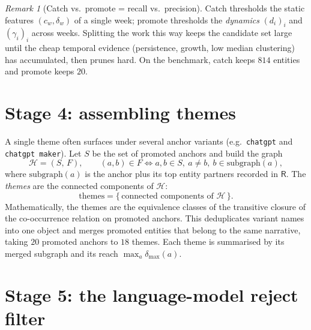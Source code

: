 \documentclass[11pt]{article}
\renewcommand{\deg}{\delta}                               %
\newcommand{\clu}{\gamma}                                 %
\newcommand{\Rtab}{\mathsf{R}}
\theoremstyle{definition}
\theoremstyle{remark}
\newtheorem{remark}{Remark}
\begin{document}
\begin{remark}[Catch vs.\ promote = recall vs.\ precision]
Catch thresholds the static features $(c_w,\deg_w)$ of a single week; promote thresholds the
\emph{dynamics} $(d_i)_i$ and $(\clu_i)_i$ across weeks. Splitting the work this way keeps the
candidate set large until the cheap temporal evidence (persistence, growth, low median
clustering) has accumulated, then prunes hard. On the benchmark, catch keeps $814$ entities and
promote keeps $20$.
\end{remark}

\section{Stage 4: assembling themes}\label{sec:stage4}

A single theme often surfaces under several anchor variants (e.g.\ \texttt{chatgpt} and
\texttt{chatgpt maker}). Let $S$ be the set of promoted anchors and build the graph
\begin{equation}
\mathcal{H}=(S,\,F),\qquad
(a,b)\in F \iff a,b\in S,\ a\ne b,\ b\in\mathrm{subgraph}(a),
\end{equation}
where $\mathrm{subgraph}(a)$ is the anchor plus its top entity partners recorded in $\Rtab$.
The \emph{themes} are the connected components of $\mathcal{H}$:
\begin{equation}
\text{themes}=\bigl\{\,\text{connected components of }\mathcal{H}\,\bigr\}.
\end{equation}
Mathematically, the themes are the equivalence classes of the transitive closure of the
co-occurrence relation on promoted anchors. This deduplicates variant names into one object and
merges promoted entities that belong to the same narrative, taking $20$ promoted anchors to
$18$ themes. Each theme is summarised by its merged subgraph and its reach
$\max_{a}\deg_{\max}(a)$.

\section{Stage 5: the language-model reject filter}\label{sec:stage5}
\end{document}
